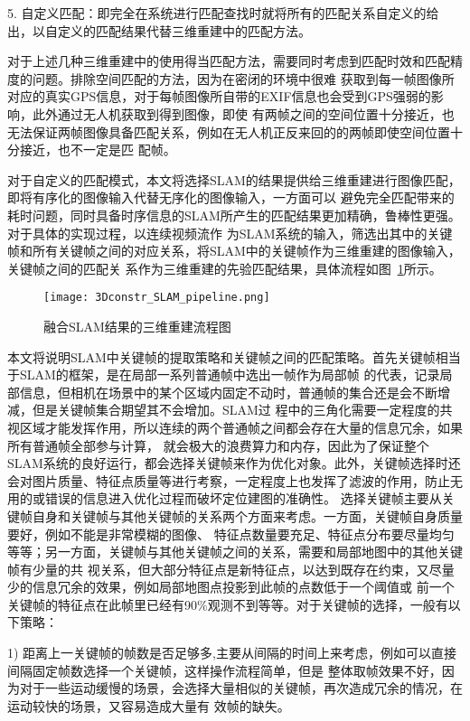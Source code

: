 5.  自定义匹配：即完全在系统进行匹配查找时就将所有的匹配关系自定义的给出，以自定义的匹配结果代替三维重建中的匹配方法。

对于上述几种三维重建中的使用得当匹配方法，需要同时考虑到匹配时效和匹配精度的问题。排除空间匹配的方法，因为在密闭的环境中很难
获取到每一帧图像所对应的真实GPS信息，对于每帧图像所自带的EXIF信息也会受到GPS强弱的影响，此外通过无人机获取到得到图像，即使
有两帧之间的空间位置十分接近，也无法保证两帧图像具备匹配关系，例如在无人机正反来回的的两帧即使空间位置十分接近，也不一定是匹
配帧。

对于自定义的匹配模式，本文将选择SLAM的结果提供给三维重建进行图像匹配，即将有序化的图像输入代替无序化的图像输入，一方面可以
避免完全匹配带来的耗时问题，同时具备时序信息的SLAM所产生的匹配结果更加精确，鲁棒性更强。对于具体的实现过程，以连续视频流作
为SLAM系统的输入，筛选出其中的关键帧和所有关键帧之间的对应关系，将SLAM中的关键帧作为三维重建的图像输入，关键帧之间的匹配关
系作为三维重建的先验匹配结果，具体流程如图~\ref{fig:3Dconstr_SLAM_pipeline}所示。
\begin{figure}[H] %
  \centering
  \texttt{[image: 3Dconstr\_SLAM\_pipeline.png]}
  \caption{融合SLAM结果的三维重建流程图}
  \label{fig:3Dconstr_SLAM_pipeline}
\end{figure}
本文将说明SLAM中关键帧的提取策略和关键帧之间的匹配策略。首先关键帧相当于SLAM的框架，是在局部一系列普通帧中选出一帧作为局部帧
的代表，记录局部信息，但相机在场景中的某个区域内固定不动时，普通帧的集合还是会不断增减，但是关键帧集合期望其不会增加。SLAM过
程中的三角化需要一定程度的共视区域才能发挥作用，所以连续的两个普通帧之间都会存在大量的信息冗余，如果所有普通帧全部参与计算，
就会极大的浪费算力和内存，因此为了保证整个SLAM系统的良好运行，都会选择关键帧来作为优化对象。此外，关键帧选择时还会对图片质量、特征点质量等进行考察，一定程度上也发挥了滤波的作用，防止无用的或错误的信息进入优化过程而破坏定位建图的准确性。
选择关键帧主要从关键帧自身和关键帧与其他关键帧的关系两个方面来考虑。一方面，关键帧自身质量要好，例如不能是非常模糊的图像、
特征点数量要充足、特征点分布要尽量均匀等等；另一方面，关键帧与其他关键帧之间的关系，需要和局部地图中的其他关键帧有少量的共
视关系，但大部分特征点是新特征点，以达到既存在约束，又尽量少的信息冗余的效果，例如局部地图点投影到此帧的点数低于一个阈值或
前一个关键帧的特征点在此帧里已经有90$\%$观测不到等等。对于关键帧的选择，一般有以下策略：

1)	距离上一关键帧的帧数是否足够多,主要从间隔的时间上来考虑，例如可以直接间隔固定帧数选择一个关键帧，这样操作流程简单，但是
整体取帧效果不好，因为对于一些运动缓慢的场景，会选择大量相似的关键帧，再次造成冗余的情况，在运动较快的场景，又容易造成大量有
效帧的缺失。

